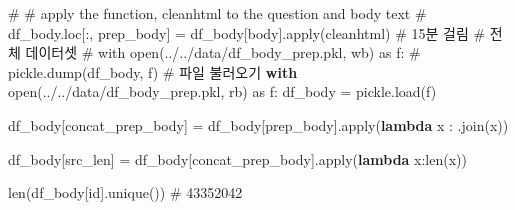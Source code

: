 \documentclass[
  letterpaper,
  DIV=11,
  numbers=noendperiod]{scrartcl}
\newenvironment{Shaded}{\begin{snugshade}}{\end{snugshade}}
\newcommand{\BuiltInTok}[1]{\textcolor[rgb]{0.00,0.23,0.31}{#1}}
\newcommand{\CommentTok}[1]{\textcolor[rgb]{0.37,0.37,0.37}{#1}}
\newcommand{\ControlFlowTok}[1]{\textcolor[rgb]{0.00,0.23,0.31}{\textbf{#1}}}
\newcommand{\ImportTok}[1]{\textcolor[rgb]{0.00,0.46,0.62}{#1}}
\newcommand{\KeywordTok}[1]{\textcolor[rgb]{0.00,0.23,0.31}{\textbf{#1}}}
\newcommand{\NormalTok}[1]{\textcolor[rgb]{0.00,0.23,0.31}{#1}}
\newcommand{\OperatorTok}[1]{\textcolor[rgb]{0.37,0.37,0.37}{#1}}
\newcommand{\StringTok}[1]{\textcolor[rgb]{0.13,0.47,0.30}{#1}}
\begin{document}
\begin{Shaded}
\begin{Highlighting}[]
\CommentTok{\# \# apply the function, cleanhtml to the question and body text}
\CommentTok{\# df\_body.loc[:, \textquotesingle{}prep\_body\textquotesingle{}] = df\_body[\textquotesingle{}body\textquotesingle{}].apply(cleanhtml)}
\CommentTok{\# 15분 걸림}
\CommentTok{\# 전체 데이터셋 }
\CommentTok{\# with open(\textquotesingle{}../../data/df\_body\_prep.pkl\textquotesingle{}, \textquotesingle{}wb\textquotesingle{}) as f:}
\CommentTok{\#     pickle.dump(df\_body, f)}
\CommentTok{\# 파일 불러오기}
\ControlFlowTok{with} \BuiltInTok{open}\NormalTok{(}\StringTok{\textquotesingle{}../../data/df\_body\_prep.pkl\textquotesingle{}}\NormalTok{, }\StringTok{\textquotesingle{}rb\textquotesingle{}}\NormalTok{) }\ImportTok{as}\NormalTok{ f:}
\NormalTok{    df\_body }\OperatorTok{=}\NormalTok{ pickle.load(f)}
\end{Highlighting}
\end{Shaded}

\begin{Shaded}
\begin{Highlighting}[]
\NormalTok{df\_body[}\StringTok{\textquotesingle{}concat\_prep\_body\textquotesingle{}}\NormalTok{] }\OperatorTok{=}\NormalTok{ df\_body[}\StringTok{\textquotesingle{}prep\_body\textquotesingle{}}\NormalTok{].}\BuiltInTok{apply}\NormalTok{(}\KeywordTok{lambda}\NormalTok{ x : }\StringTok{\textquotesingle{}\textquotesingle{}}\NormalTok{.join(x))}
\end{Highlighting}
\end{Shaded}

\begin{Shaded}
\begin{Highlighting}[]
\NormalTok{df\_body[}\StringTok{\textquotesingle{}src\_len\textquotesingle{}}\NormalTok{] }\OperatorTok{=}\NormalTok{ df\_body[}\StringTok{\textquotesingle{}concat\_prep\_body\textquotesingle{}}\NormalTok{].}\BuiltInTok{apply}\NormalTok{(}\KeywordTok{lambda}\NormalTok{ x:}\BuiltInTok{len}\NormalTok{(x))}
\end{Highlighting}
\end{Shaded}

\begin{Shaded}
\begin{Highlighting}[]
\BuiltInTok{len}\NormalTok{(df\_body[}\StringTok{\textquotesingle{}id\textquotesingle{}}\NormalTok{].unique())}
\CommentTok{\# 43352042}
\end{Highlighting}
\end{Shaded}
\end{document}
